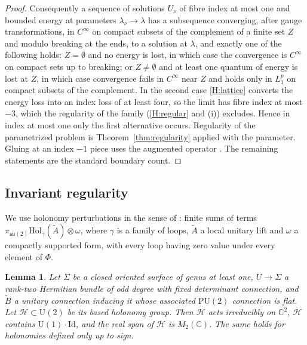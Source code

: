 \documentclass[11pt]{amsart}
\newtheorem{lemma}[theorem]{Lemma}
\theoremstyle{definition}
\theoremstyle{remark}
\theoremstyle{plain}
\numberwithin{equation}{section}
\newcommand{\CC}{\mathbb{C}}
\newcommand{\U}{\mathrm{U}}
\begin{document}
\begin{proof}
Consequently a sequence of solutions $U_\nu$ of fibre index at most one and
bounded energy at parameters $\lambda_\nu\to\lambda$ has a subsequence converging,
after gauge transformations, in $C^\infty$ on compact subsets of the
complement of a finite set $Z$ and modulo breaking at the ends, to a
solution at $\lambda$, and exactly one of the following holds: $Z=\emptyset$ and
no energy is lost, in which case the convergence is $C^\infty$ on compact sets
up to breaking; or $Z\neq\emptyset$ and at least one quantum of energy is lost
at $Z$, in which case convergence fails in $C^\infty$ near $Z$ and holds only
in $L^p_1$ on compact subsets of the complement. In the second case
\ref{H:lattice} converts the energy loss into an index loss of at least four,
so the limit has fibre index at most $-3$, which the regularity of the
family (\ref{H:regular} and (i)) excludes. Hence in index at most one only
the first alternative occurs. Regularity of the parametrized problem is Theorem~\ref{thm:regularity}
applied with the parameter. Gluing at an index $-1$ piece uses the
augmented operator \cite[Section~5.3, (5.6)]{Donaldson-book}. The
remaining statements are the standard boundary count.
\end{proof}

\subsection{Invariant regularity}

We use holonomy perturbations in the sense of
\cite[Section~6.2, (6.13)--(6.14)]{DFL}: finite sums of terms
$\pi_{\mathfrak{su}(2)}\mathrm{Hol}_\gamma(\tilde A)\otimes\omega$, where
$\gamma$ is a family of loops, $\tilde A$ a local unitary lift and
$\omega$ a compactly supported form, with every loop having zero value
under every element of $\Phi$.

\begin{lemma}\label{lem:invariant-span}
Let $\Sigma$ be a closed oriented surface of genus at least one,
$U\to\Sigma$ a rank-two Hermitian bundle of odd degree with fixed
determinant connection, and $\tilde B$ a unitary connection inducing it
whose associated $\mathrm{PU}(2)$ connection is flat. Let $\mathcal H\subset
\U(2)$ be its based holonomy group. Then $\mathcal H$ acts irreducibly on
$\CC^2$, $\mathcal H$ contains $\U(1)\cdot\mathrm{Id}$, and the real span of
$\mathcal H$ is $M_2(\CC)$. The same holds for holonomies defined only up
to sign.
\end{lemma}
\end{document}
